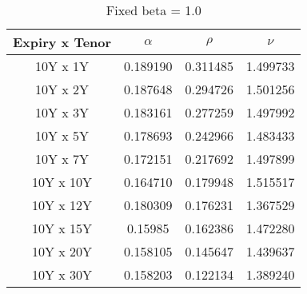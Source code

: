 \begin{table}[H]
    \centering
    \begin{tabular}{cccc}
      \toprule
      \textbf{Expiry x Tenor} & \textbf{$\alpha$} & \textbf{$\rho$}  & \textbf{$\nu$} \\
      \midrule
      \rowcolor{lightgray!40} 10Y x 1Y &0.189190 & 0.311485 & 1.499733 \\
      10Y x 2Y  &0.187648 & 0.294726 & 1.501256 \\
      \rowcolor{lightgray!40} 10Y x 3Y  &0.183161 & 0.277259 & 1.497992 \\
      10Y x 5Y  &0.178693 & 0.242966 & 1.483433 \\
      \rowcolor{lightgray!40} 10Y x 7Y  &0.172151 & 0.217692 & 1.497899 \\
      10Y x 10Y &0.164710 & 0.179948 & 1.515517 \\
      \rowcolor{lightgray!40} 10Y x 12Y &0.180309 & 0.176231 & 1.367529 \\
      10Y x 15Y & 0.15985 & 0.162386 & 1.472280 \\
      \rowcolor{lightgray!40} 10Y x 20Y &0.158105 & 0.145647 & 1.439637 \\
      10Y x 30Y &0.158203 & 0.122134 & 1.389240 \\
      \bottomrule
    \end{tabular}
    \caption{Fixed beta = 1.0}
    \label{tab:beta_0.5}
\end{table}
\noindent


